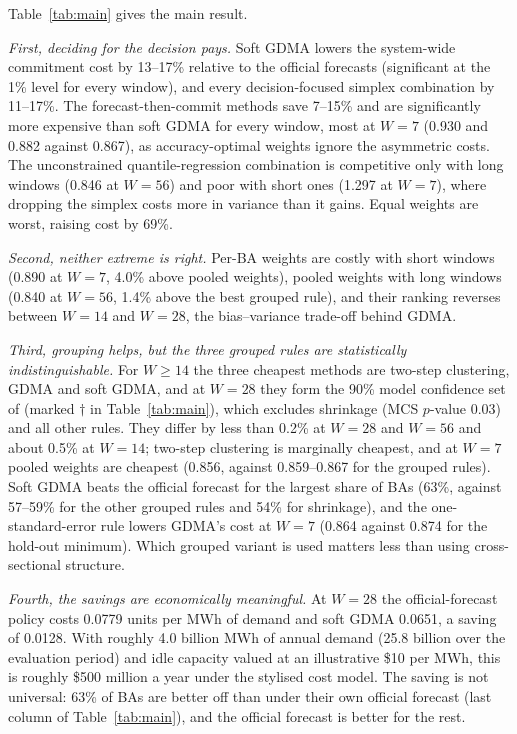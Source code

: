 Table~\ref{tab:main} gives the main result.

\emph{First, deciding for the decision pays.}
Soft GDMA lowers the system-wide commitment cost by 13--17\% relative to the official forecasts (significant at the 1\% level for every window), and every decision-focused simplex combination by 11--17\%.
The forecast-then-commit methods save 7--15\% and are significantly more expensive than soft GDMA for every window, most at $W=7$ (0.930 and 0.882 against 0.867), as accuracy-optimal weights ignore the asymmetric costs.
The unconstrained quantile-regression combination is competitive only with long windows (0.846 at $W=56$) and poor with short ones (1.297 at $W=7$), where dropping the simplex costs more in variance than it gains.
Equal weights are worst, raising cost by 69\%.

\emph{Second, neither extreme is right.}
Per-BA weights are costly with short windows (0.890 at $W=7$, 4.0\% above pooled weights), pooled weights with long windows (0.840 at $W=56$, 1.4\% above the best grouped rule), and their ranking reverses between $W=14$ and $W=28$, the bias--variance trade-off behind GDMA.

\emph{Third, grouping helps, but the three grouped rules are statistically indistinguishable.}
For $W\ge14$ the three cheapest methods are two-step clustering, GDMA and soft GDMA, and at $W=28$ they form the 90\% model confidence set of \citet{Hansen2011mcs} (marked $\dagger$ in Table~\ref{tab:main}), which excludes shrinkage (MCS $p$-value 0.03) and all other rules.
They differ by less than 0.2\% at $W=28$ and $W=56$ and about 0.5\% at $W=14$; two-step clustering is marginally cheapest, and at $W=7$ pooled weights are cheapest (0.856, against 0.859--0.867 for the grouped rules).
Soft GDMA beats the official forecast for the largest share of BAs (63\%, against 57--59\% for the other grouped rules and 54\% for shrinkage), and the one-standard-error rule lowers GDMA's cost at $W=7$ (0.864 against 0.874 for the hold-out minimum).
Which grouped variant is used matters less than using cross-sectional structure.

\emph{Fourth, the savings are economically meaningful.}
At $W=28$ the official-forecast policy costs 0.0779 units per MWh of demand and soft GDMA 0.0651, a saving of 0.0128.
With roughly 4.0 billion MWh of annual demand (25.8 billion over the evaluation period) and idle capacity valued at an illustrative \$10 per MWh, this is roughly \$500 million a year under the stylised cost model.
The saving is not universal: 63\% of BAs are better off than under their own official forecast (last column of Table~\ref{tab:main}), and the official forecast is better for the rest.

